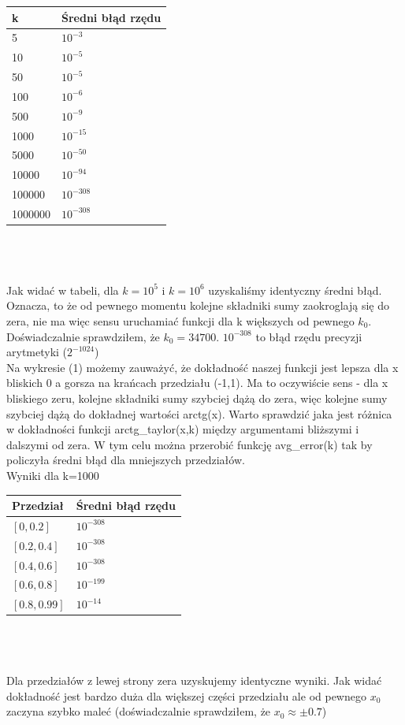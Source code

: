 \documentclass[11pt,a4paper]{article}
\begin{document}
    \begin{tabular}{|l|l|}
        \hline
        \textbf{k} & \textbf{Średni błąd rzędu} \\
        \hline
        5 & $10^{-3}$\\
        10 & $10^{-5}$\\
        50 & $10^{-5}$\\
        100 & $10^{-6}$\\
        500 & $10^{-9}$\\
        1000 & $10^{-15}$\\
        5000 & $10^{-50}$\\
        10000 & $10^{-94}$\\
        100000 & $10^{-308}$\\
        1000000 & $10^{-308}$\\
        \hline
    \end{tabular}\\\\\\
    Jak widać w tabeli, dla $k = 10^5$ i $k = 10^6$ uzyskaliśmy identyczny średni błąd. Oznacza, to że od pewnego momentu kolejne składniki sumy zaokroglają się do zera, nie ma więc sensu uruchamiać funkcji dla k większych od pewnego $k_0$. Doświadczalnie sprawdziłem, że $k_0 = 34700$. $10^{-308}$ to błąd rzędu precyzji arytmetyki ($2^{-1024}$)\\

    Na wykresie (1) możemy zauważyć, że dokładność naszej funkcji jest lepsza dla x bliskich 0 a gorsza na krańcach przedziału (-1,1). Ma to oczywiście sens - dla x bliskiego zeru, kolejne składniki sumy szybciej dążą do zera, więc kolejne sumy szybciej dążą do dokładnej wartości arctg(x). Warto sprawdzić jaka jest różnica w dokładności funkcji arctg\_taylor(x,k) między argumentami bliższymi i dalszymi od zera. W tym celu można przerobić funkcję avg\_error(k) tak by policzyła średni błąd dla mniejszych przedziałów.\\

    Wyniki dla k=1000\\

    \begin{tabular}{|l|l|}
        \hline
        \textbf{Przedział} & \textbf{Średni błąd rzędu}\\
        \hline
       $[0,0.2]$ & $10^{-308}$ \\
       $[0.2,0.4]$ & $10^{-308}$ \\
       $[0.4,0.6]$ & $10^{-308}$ \\
       $[0.6,0.8]$ & $10^{-199}$ \\
       $[0.8,0.99]$ & $10^{-14}$ \\
       \hline
    \end{tabular}\\\\\\
    Dla przedziałów z lewej strony zera uzyskujemy identyczne wyniki. Jak widać dokładność jest bardzo duża dla większej części przedziału ale od pewnego $x_0$ zaczyna szybko maleć (doświadczalnie sprawdziłem, że $x_0 \approx \pm 0.7$)
\end{document}
